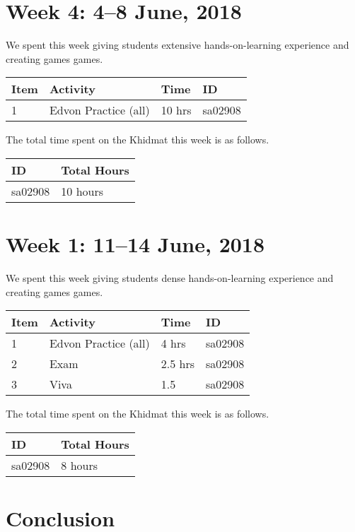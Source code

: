 \documentclass{article}
\begin{document}

\newpage 
\section*{Week 4: 4--8 June, 2018}

We spent this week giving students extensive hands-on-learning experience and creating games games.

\begin{tabular}{|l|l|l|l|}
  \hline
  Item  & Activity & Time & ID \\\hline\hline
  1 & Edvon Practice (all) & 10 hrs & sa02908 \\\hline
\end{tabular}

The total time spent on the Khidmat this week is as follows.

\begin{tabular}{|l|l|}
  \hline
  ID & Total Hours\\\hline\hline
  sa02908 & 10 hours\\\hline
\end{tabular}


\newpage
\section*{Week 1: 11--14 June, 2018}

We spent this week giving students dense hands-on-learning experience and creating games games.

\begin{tabular}{|l|l|l|l|}
  \hline
  Item  & Activity & Time & ID \\\hline\hline
  1 & Edvon Practice (all) & 4 hrs & sa02908 \\\hline
  2 & Exam & 2.5 hrs & sa02908 \\\hline
  3 & Viva & 1.5 & sa02908 \\\hline
\end{tabular}

The total time spent on the Khidmat this week is as follows.

\begin{tabular}{|l|l|}
  \hline
  ID & Total Hours\\\hline\hline
  sa02908 & 8 hours\\\hline
\end{tabular}

\newpage
\section*{Conclusion}
\end{document}

